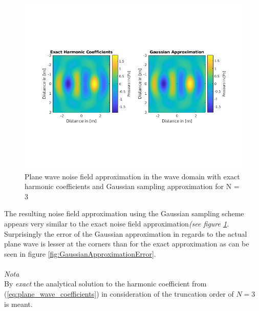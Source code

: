 \begin{figure}
    \centerline{\includegraphics[width=\paperwidth]{LaTeX/images/plots/Gauss_Approcimation.png}}
    \caption{Plane wave noise field approximation in the wave domain with exact harmonic coefficients and Gaussian sampling approximation for N = 3}
    \label{fig:GaussianApproximation}
\end{figure}

The resulting noise field approximation using the Gaussian sampling scheme appears very similar to the exact noise field approximation\textit{(see figure \ref{fig:GaussianApproximation}}.\\
Surprisingly the error of the Gaussian approximation in regards to the actual plane wave is lesser at the corners than for the exact approximation as can be seen in figure \ref{fig:GaussianApproximationError}.\\\\

\textit{Nota}\\
By \textit{exact} the analytical solution to the harmonic coefficient from (\ref{eq:plane_wave_coefficients}) in consideration of the truncation order of $N = 3$ is meant. 


